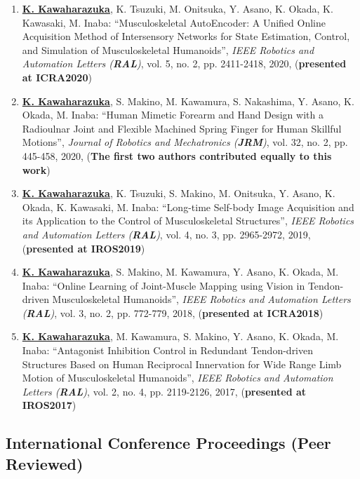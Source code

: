 \documentclass[letterpaper]{article}
\begin{document}
\begin{enumerate}
\item \underline{\textbf{K. Kawaharazuka}}, K. Tsuzuki, M. Onitsuka, Y. Asano, K. Okada, K. Kawasaki, M. Inaba: ``Musculoskeletal AutoEncoder: A Unified Online Acquisition Method of Intersensory Networks for State Estimation, Control, and Simulation of Musculoskeletal Humanoids'', \textit{IEEE Robotics and Automation Letters (\textit{\textbf{RAL}})}, vol. 5, no. 2, pp. 2411-2418, 2020, (\textbf{presented at ICRA2020})
\item \underline{\textbf{K. Kawaharazuka}}, S. Makino, M. Kawamura, S. Nakashima, Y. Asano, K. Okada, M. Inaba: ``Human Mimetic Forearm and Hand Design with a Radioulnar Joint and Flexible Machined Spring Finger for Human Skillful Motions'', \textit{Journal of Robotics and Mechatronics (\textit{\textbf{JRM}})}, vol. 32, no. 2, pp. 445-458, 2020, (\textbf{The first two authors contributed equally to this work})
\item \underline{\textbf{K. Kawaharazuka}}, K. Tsuzuki, S. Makino, M. Onitsuka, Y. Asano, K. Okada, K. Kawasaki, M. Inaba: ``Long-time Self-body Image Acquisition and its Application to the Control of Musculoskeletal Structures'', \textit{IEEE Robotics and Automation Letters (\textit{\textbf{RAL}})}, vol. 4, no. 3, pp. 2965-2972, 2019, (\textbf{presented at IROS2019})
\item \underline{\textbf{K. Kawaharazuka}}, S. Makino, M. Kawamura, Y. Asano, K. Okada, M. Inaba: ``Online Learning of Joint-Muscle Mapping using Vision in Tendon-driven Musculoskeletal Humanoids'', \textit{IEEE Robotics and Automation Letters (\textit{\textbf{RAL}})}, vol. 3, no. 2, pp. 772-779, 2018, (\textbf{presented at ICRA2018})
\item \underline{\textbf{K. Kawaharazuka}}, M. Kawamura, S. Makino, Y. Asano, K. Okada, M. Inaba: ``Antagonist Inhibition Control in Redundant Tendon-driven Structures Based on Human Reciprocal Innervation for Wide Range Limb Motion of Musculoskeletal Humanoids'', \textit{IEEE Robotics and Automation Letters (\textit{\textbf{RAL}})}, vol. 2, no. 4, pp. 2119-2126, 2017, (\textbf{presented at IROS2017})
\end{enumerate}

\subsection*{International Conference Proceedings (Peer Reviewed)}
\end{document}
